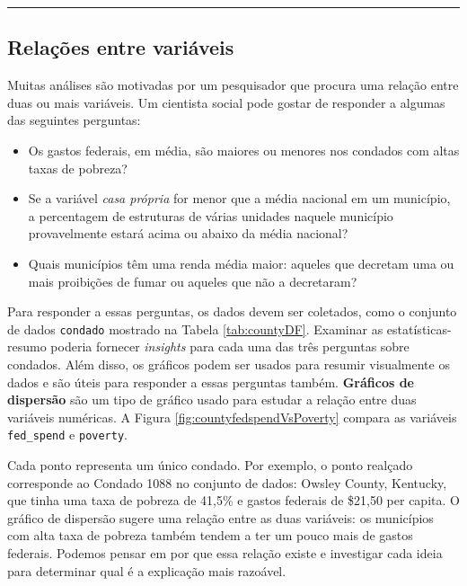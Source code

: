 \documentclass[
]{book}
\theoremstyle{definition}
\theoremstyle{definition}
\theoremstyle{definition}
\theoremstyle{definition}
\theoremstyle{remark}
\begin{document}
\begin{center}\rule{0.5\linewidth}{0.5pt}\end{center}

\hypertarget{variableRelations}{%
\subsection{Relações entre variáveis}\label{variableRelations}}

Muitas análises são motivadas por um pesquisador que procura uma relação entre duas ou mais variáveis. Um cientista social pode gostar de responder a algumas das seguintes perguntas:

\begin{itemize}
\item
  Os gastos federais, em média, são maiores ou menores nos condados com altas taxas de pobreza?
\item
  Se a variável \emph{casa própria} for menor que a média nacional em um município, a percentagem de estruturas de várias unidades naquele município provavelmente estará acima ou abaixo da média nacional?
\item
  Quais municípios têm uma renda média maior: aqueles que decretam uma ou mais proibições de fumar ou aqueles que não a decretaram?
\end{itemize}

Para responder a essas perguntas, os dados devem ser coletados, como o conjunto de dados \texttt{condado} mostrado na Tabela \ref{tab:countyDF}. Examinar as estatísticas-resumo poderia fornecer \emph{insights} para cada uma das três perguntas sobre condados. Além disso, os gráficos podem ser usados para resumir visualmente os dados e são úteis para responder a essas perguntas também. \textbf{Gráficos de dispersão} são um tipo de gráfico usado para estudar a relação entre duas variáveis numéricas. A Figura \ref{fig:countyfedspendVsPoverty} compara as variáveis \texttt{fed\_spend} e \texttt{poverty}.

Cada ponto representa um único condado. Por exemplo, o ponto realçado corresponde ao Condado 1088 no conjunto de dados: Owsley County, Kentucky, que tinha uma taxa de pobreza de 41,5\% e gastos federais de \$21,50 per capita. O gráfico de dispersão sugere uma relação entre as duas variáveis: os municípios com alta taxa de pobreza também tendem a ter um pouco mais de gastos federais. Podemos pensar em por que essa relação existe e investigar cada ideia para determinar qual é a explicação mais razoável.
\end{document}
